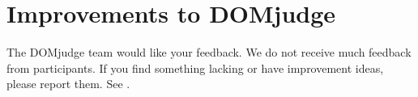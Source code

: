 \documentclass[a4paper,10pt,english,openany]{sphinxmanual}
\begin{document}
\def\sphinxLiteralBlockLabel{\label{\detokenize{team:id12}}}
\begin{sphinxVerbatim}[commandchars=\\\{\}]

\end{sphinxVerbatim}


\section{Improvements to DOMjudge}
\label{\detokenize{team:improvements-to-domjudge}}
\sphinxAtStartPar
The DOMjudge team would like your feedback. We do not receive much feedback from participants.
If you find something lacking or have improvement ideas, please report them. See .



\renewcommand{\indexname}{Index}
\printindex
\end{document}
